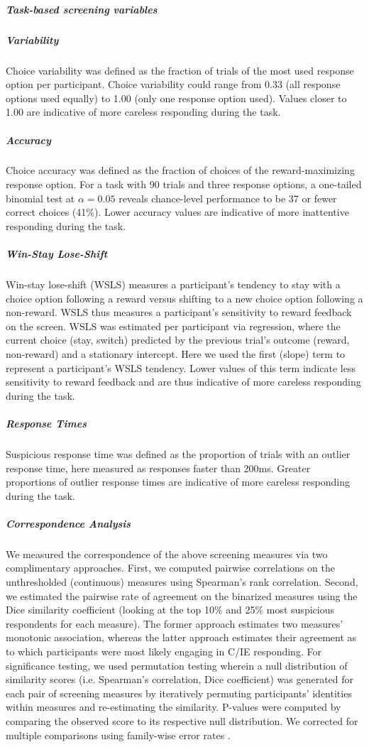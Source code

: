 \documentclass[a4paper,notitlepage,12pt]{article}
\begin{document}
\begin{refsection}[main]
\subparagraph{Task-based screening variables}

\subparagraph{Variability} Choice variability was defined as the fraction of trials of the most used response option per participant. Choice variability could range from 0.33 (all response options used equally) to 1.00 (only one response option used). Values closer to 1.00 are indicative of more careless responding during the task.  

\subparagraph{Accuracy} Choice accuracy was defined as the fraction of choices of the reward-maximizing response option. For a task with 90 trials and three response options, a one-tailed binomial test at $\alpha=0.05$ reveals chance-level performance to be 37 or fewer correct choices (41\%). Lower accuracy values are indicative of more inattentive responding during the task.

\subparagraph{Win-Stay Lose-Shift} Win-stay lose-shift (WSLS) measures a participant's tendency to stay with a choice option following a reward versus shifting to a new choice option following a non-reward. WSLS thus measures a participant's sensitivity to reward feedback on the screen. WSLS was estimated per participant via regression, where the current choice (stay, switch) predicted by the previous trial's outcome (reward, non-reward) and a stationary intercept. Here we used the first (slope) term to represent a participant's WSLS tendency. Lower values of this term indicate less sensitivity to reward feedback and are thus indicative of more careless responding during the task.

\subparagraph{Response Times} Suspicious response time was defined as the proportion of trials with an outlier response time, here measured as responses faster than 200ms. Greater proportions of outlier response times are indicative of more careless responding during the task.  

\subparagraph{Correspondence Analysis} We measured the correspondence of the above screening measures via two complimentary approaches. First, we computed pairwise correlations on the unthresholded (continuous) measures using Spearman's rank correlation. Second, we estimated the pairwise rate of agreement on the binarized measures using the Dice similarity coefficient (looking at the top 10\% and 25\% most suspicious respondents for each measure). The former approach estimates two measures' monotonic association, whereas the latter approach estimates their agreement as to which participants were most likely engaging in C/IE responding. For significance testing, we used permutation testing wherein a null distribution of similarity scores (i.e. Spearman's correlation, Dice coefficient) was generated for each pair of screening measures by iteratively permuting participants' identities within measures and re-estimating the similarity. P-values were computed by comparing the observed score to its respective null distribution. We corrected for multiple comparisons using family-wise error rates \cite{winkler2014permutation}.


\end{refsection}
\end{document}
